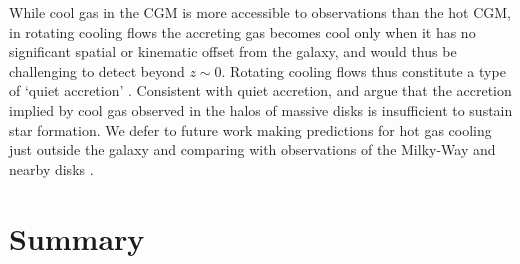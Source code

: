 \documentclass[fleqn,usenatbib]{mnras}
\begin{document}
While cool gas in the CGM is more accessible to observations than the hot CGM, in rotating cooling flows the accreting gas becomes cool only when it has no significant spatial or kinematic offset from the galaxy, and would thus be challenging to detect beyond $z\sim0$.
Rotating cooling flows thus constitute a type of `quiet accretion' \citep{Putman2012}. 
Consistent with quiet accretion, \cite{Sancisi2008} and \cite{Binney2009} argue that the accretion implied by cool gas observed in the halos of massive disks is insufficient to sustain star formation.
We defer to future work making predictions for hot gas cooling just outside the galaxy and comparing with observations of the Milky-Way and nearby disks \citep[e.g.,][]{Zheng2017}. 




\section{Summary}
\label{s: conclusions}
\end{document}
